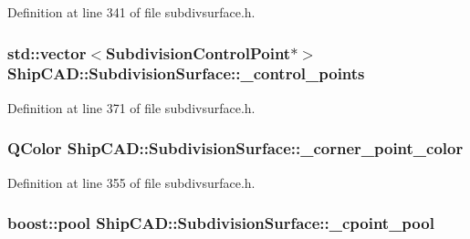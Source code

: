 Definition at line 341 of file subdivsurface.\-h.

\hypertarget{classShipCAD_1_1SubdivisionSurface_a906d5981dc482ede1bb3c7256e750945}{
\subsubsection[{\-\_\-control\-\_\-points}]{\setlength{\rightskip}{0pt plus 5cm}std\-::vector$<${\bf Subdivision\-Control\-Point}$\ast$$>$ Ship\-C\-A\-D\-::\-Subdivision\-Surface\-::\-\_\-control\-\_\-points\hspace{0.3cm}{\ttfamily [protected]}}}\label{classShipCAD_1_1SubdivisionSurface_a906d5981dc482ede1bb3c7256e750945}


Definition at line 371 of file subdivsurface.\-h.

\hypertarget{classShipCAD_1_1SubdivisionSurface_aba9fae36ed19b802707c748396c1fd63}{
\subsubsection[{\-\_\-corner\-\_\-point\-\_\-color}]{\setlength{\rightskip}{0pt plus 5cm}Q\-Color Ship\-C\-A\-D\-::\-Subdivision\-Surface\-::\-\_\-corner\-\_\-point\-\_\-color\hspace{0.3cm}{\ttfamily [protected]}}}\label{classShipCAD_1_1SubdivisionSurface_aba9fae36ed19b802707c748396c1fd63}


Definition at line 355 of file subdivsurface.\-h.

\hypertarget{classShipCAD_1_1SubdivisionSurface_abd895a11906e0d5b5f8f4a5fc090b428}{
\subsubsection[{\-\_\-cpoint\-\_\-pool}]{\setlength{\rightskip}{0pt plus 5cm}boost\-::pool Ship\-C\-A\-D\-::\-Subdivision\-Surface\-::\-\_\-cpoint\-\_\-pool\hspace{0.3cm}{\ttfamily [protected]}}}\label{classShipCAD_1_1SubdivisionSurface_abd895a11906e0d5b5f8f4a5fc090b428}


